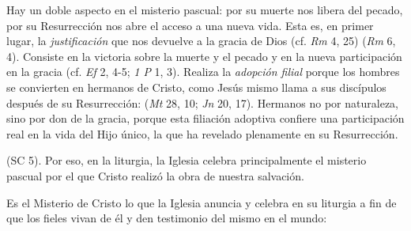 
\begin{ccebody}

 Hay un doble aspecto en el misterio pascual: por su muerte nos libera del pecado, por su Resurrección nos abre el acceso a una nueva vida. Esta es, en primer lugar, la \textit{justificación} que nos devuelve a la gracia de Dios (cf. \textit{Rm} 4, 25)  (\textit{Rm} 6, 4). Consiste en la victoria sobre la muerte y el pecado y en la nueva participación en la gracia (cf. \textit{Ef} 2, 4-5; \textit{1 P} 1, 3). Realiza la \textit{adopción filial} porque los hombres se convierten en hermanos de Cristo, como Jesús mismo llama a sus discípulos después de su Resurrección:  (\textit{Mt} 28, 10; \textit{Jn} 20, 17). Hermanos no por naturaleza, sino por don de la gracia, porque esta filiación adoptiva confiere una participación real en la vida del Hijo único, la que ha revelado plenamente en su Resurrección.

  (SC 5). Por eso, en la liturgia, la Iglesia celebra principalmente el misterio pascual por el que Cristo realizó la obra de nuestra salvación.

 Es el Misterio de Cristo lo que la Iglesia anuncia y celebra en su liturgia a fin de que los fieles vivan de él y den testimonio del mismo en el mundo:


\newpage
{}


\end{ccebody}
